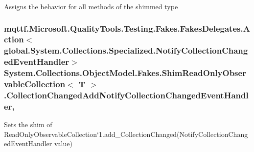 Assigns the behavior for all methods of the shimmed type

\hypertarget{class_system_1_1_collections_1_1_object_model_1_1_fakes_1_1_shim_read_only_observable_collection_3_01_t_01_4_a461ae34259eb7b8ee10bee46b268f432}{
\subsubsection[{Collection\-Changed\-Add\-Notify\-Collection\-Changed\-Event\-Handler}]{\setlength{\rightskip}{0pt plus 5cm}mqttf.\-Microsoft.\-Quality\-Tools.\-Testing.\-Fakes.\-Fakes\-Delegates.\-Action$<$global.\-System.\-Collections.\-Specialized.\-Notify\-Collection\-Changed\-Event\-Handler$>$ System.\-Collections.\-Object\-Model.\-Fakes.\-Shim\-Read\-Only\-Observable\-Collection$<$ T $>$.Collection\-Changed\-Add\-Notify\-Collection\-Changed\-Event\-Handler\hspace{0.3cm}{\ttfamily [set]}, {\ttfamily [add]}}}\label{class_system_1_1_collections_1_1_object_model_1_1_fakes_1_1_shim_read_only_observable_collection_3_01_t_01_4_a461ae34259eb7b8ee10bee46b268f432}


Sets the shim of Read\-Only\-Observable\-Collection`1.add\-\_\-\-Collection\-Changed(\-Notify\-Collection\-Changed\-Event\-Handler value)

